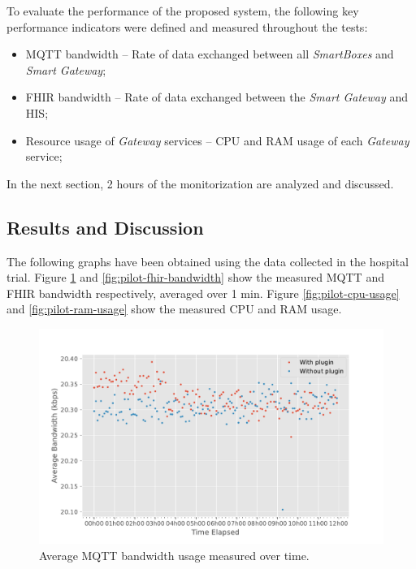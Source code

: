 To evaluate the performance of the proposed system, the following key performance indicators were defined and measured throughout the tests:

\begin{itemize}
    \item \acs{MQTT} bandwidth -- Rate of data exchanged between all \textit{SmartBoxes} and \textit{Smart Gateway};
    \item \acs{FHIR} bandwidth -- Rate of data exchanged between the \textit{Smart Gateway} and \acs{HIS};
    \item Resource usage of \textit{Gateway} services -- \acs{CPU} and \acs{RAM} usage of each \textit{Gateway} service;
\end{itemize}

In the next section, 2 hours of the monitorization are analyzed and discussed. 

\subsection{Results and Discussion}

The following graphs have been obtained using the data collected in the hospital trial. Figure \ref{fig:pilot-mqtt-bandwidth} and \ref{fig:pilot-fhir-bandwidth} show the measured \acs{MQTT} and \acs{FHIR} bandwidth respectively, averaged over 1 min.  Figure \ref{fig:pilot-cpu-usage} and \ref{fig:pilot-ram-usage} show the measured \acs{CPU} and \acs{RAM} usage.


\begin{figure}[H]
    \centering
    \includegraphics[width=0.85\linewidth]{images/pilot_mqtt_bandwidth.pdf}
    \caption{Average \acs{MQTT} bandwidth usage measured over time.}
    \label{fig:pilot-mqtt-bandwidth}
\end{figure}

